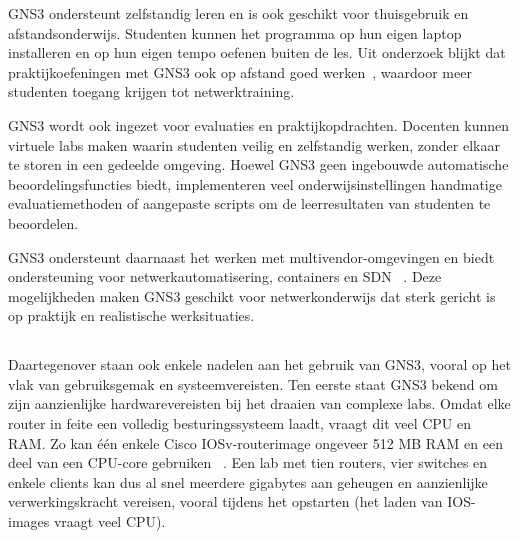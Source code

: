 \vspace{0.3cm}

GNS3 ondersteunt zelfstandig leren en is ook geschikt voor thuisgebruik en afstandsonderwijs. Studenten kunnen het programma op hun eigen laptop installeren en op hun eigen tempo oefenen buiten de les. Uit onderzoek blijkt dat praktijkoefeningen met GNS3 ook op afstand goed werken~\autocite{Sari2018}, waardoor meer studenten toegang krijgen tot netwerktraining.

\vspace{0.3cm}

GNS3 wordt ook ingezet voor evaluaties en praktijkopdrachten. Docenten kunnen virtuele labs maken waarin studenten veilig en zelfstandig werken, zonder elkaar te storen in een gedeelde omgeving. Hoewel GNS3 geen ingebouwde automatische beoordelingsfuncties biedt, implementeren veel onderwijsinstellingen handmatige evaluatiemethoden of aangepaste scripts om de leerresultaten van studenten te beoordelen. ~\autocite{pythonautomation}

\vspace{0.3cm}

GNS3 ondersteunt daarnaast het werken met multivendor-omgevingen en biedt ondersteuning voor netwerkautomatisering, containers en SDN ~\autocite{Kuzmenko2016}. Deze mogelijkheden maken GNS3 geschikt voor netwerkonderwijs dat sterk gericht is op praktijk en realistische werksituaties.



\subsection{}
\label{sec:Beperkingen}

Daartegenover staan ook enkele nadelen aan het gebruik van GNS3, vooral op het vlak van gebruiksgemak en systeemvereisten. Ten eerste staat GNS3 bekend om zijn aanzienlijke hardwarevereisten bij het draaien van complexe labs. Omdat elke router in feite een volledig besturingssysteem laadt, vraagt dit veel CPU en RAM. Zo kan één enkele Cisco IOSv-routerimage ongeveer 512 MB RAM en een deel van een CPU-core gebruiken ~\autocite{cml_faq2025}. Een lab met tien routers, vier switches en enkele clients kan dus al snel meerdere gigabytes aan geheugen en aanzienlijke verwerkingskracht vereisen, vooral tijdens het opstarten (het laden van IOS-images vraagt veel CPU).



\vspace{0.3cm}

